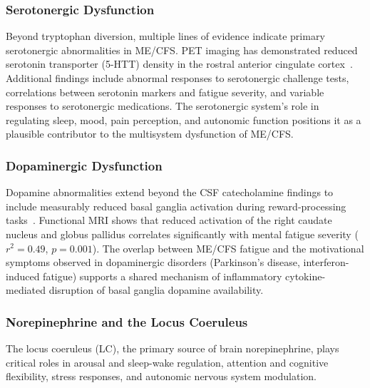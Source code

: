 \subsubsection{Serotonergic Dysfunction}

\begin{observation}
\label{obs:serotonin}
Beyond tryptophan diversion, multiple lines of evidence indicate primary serotonergic abnormalities in ME/CFS. PET imaging has demonstrated reduced serotonin transporter (5-HTT) density in the rostral anterior cingulate cortex~\cite{Yamamoto2004serotonin}. Additional findings include abnormal responses to serotonergic challenge tests, correlations between serotonin markers and fatigue severity, and variable responses to serotonergic medications. The serotonergic system's role in regulating sleep, mood, pain perception, and autonomic function positions it as a plausible contributor to the multisystem dysfunction of ME/CFS.
\end{observation}

\subsubsection{Dopaminergic Dysfunction}

\begin{observation}
\label{obs:dopamine}
Dopamine abnormalities extend beyond the CSF catecholamine findings to include measurably reduced basal ganglia activation during reward-processing tasks~\cite{Miller2014dopamine}. Functional MRI shows that reduced activation of the right caudate nucleus and globus pallidus correlates significantly with mental fatigue severity ($r^2 = 0.49$, $p = 0.001$). The overlap between ME/CFS fatigue and the motivational symptoms observed in dopaminergic disorders (Parkinson's disease, interferon-induced fatigue) supports a shared mechanism of inflammatory cytokine-mediated disruption of basal ganglia dopamine availability.
\end{observation}

\subsubsection{Norepinephrine and the Locus Coeruleus}

The locus coeruleus (LC), the primary source of brain norepinephrine, plays critical roles in arousal and sleep-wake regulation, attention and cognitive flexibility, stress responses, and autonomic nervous system modulation.

